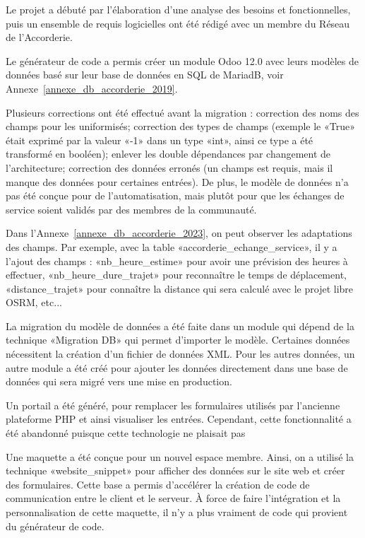 Le projet a débuté par l'élaboration d'une analyse des besoins et fonctionnelles, puis un ensemble de requis logicielles ont été rédigé avec un membre du Réseau de l'Accorderie. %

Le générateur de code a permis créer un module Odoo 12.0 avec leurs modèles de données basé sur leur base de données en SQL de MariadB, voir Annexe~\ref{annexe_db_accorderie_2019}.

Plusieurs corrections ont été effectué avant la migration : correction des noms des champs pour les uniformisés; correction des types de champs (exemple le «True» était exprimé par la valeur «-1» dans un type «int», ainsi ce type a été transformé en booléen); enlever les double dépendances par changement de l’architecture; correction des données erronés (un champs est requis, mais il manque des données pour certaines entrées). De plus, le modèle de données n’a pas été conçue pour de l’automatisation, mais plutôt pour que les échanges de service soient validés par des membres de la communauté.

Dans l'Annexe~\ref{annexe_db_accorderie_2023}, on peut observer les adaptations des champs. Par exemple, avec la table «accorderie\_echange\_service», il y a l'ajout des champs : «nb\_heure\_estime» pour avoir une prévision des heures à effectuer, «nb\_heure\_dure\_trajet» pour reconnaître le temps de déplacement, «distance\_trajet» pour connaître la distance qui sera calculé avec le projet libre OSRM, etc...

La migration du modèle de données a été faite dans un module qui dépend de la technique «Migration DB» qui permet d'importer le modèle. Certaines données nécessitent la création d’un fichier de données XML. Pour les autres données, un autre module a été créé pour ajouter les données directement dans une base de données qui sera migré vers une mise en production.

Un portail a été généré, pour remplacer les formulaires utilisés par l'ancienne plateforme PHP et ainsi visualiser les entrées. Cependant, cette fonctionnalité a été abandonné puisque cette technologie ne plaisait pas

Une maquette a été conçue pour un nouvel espace membre. Ainsi, on a utilisé la technique «website\_snippet» pour afficher des données sur le site web et créer des formulaires. Cette base a permis d’accélérer la création de code de communication entre le client et le serveur. À force de faire l’intégration et la personnalisation de cette maquette, il n’y a plus vraiment de code qui provient du générateur de code.

